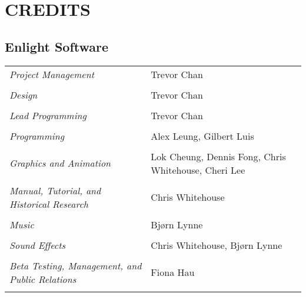 
\chapter[Credits]{\textsf{{\Huge C}REDITS}}

\section{Enlight Software}

\begin{tabular}{p{2in} p{2in}}
    \textit{Project Management} & Trevor Chan \\ \\
    \textit{Design} & Trevor Chan \\ \\
    \textit{Lead Programming} & Trevor Chan \\ \\
    \textit{Programming} & Alex Leung, Gilbert Luis \\ \\
    \textit{Graphics and Animation} & Lok Cheung, Dennis Fong, Chris Whitehouse, Cheri Lee \\ \\
    \textit{Manual, Tutorial, and Historical Research} & Chris Whitehouse \\ \\
    \textit{Music} & Bjørn Lynne \\ \\
    \textit{Sound Effects} & Chris Whitehouse, Bjørn Lynne \\ \\
    \textit{Beta Testing, Management, and Public Relations} & Fiona Hau \\ \\
\end{tabular}

